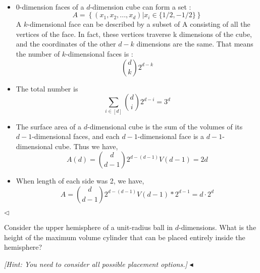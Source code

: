 \documentclass[11pt]{article}
\newenvironment{problem}[2][Problem]{\begin{trivlist}
\item[\hskip \labelsep {\bfseries #1}\hskip \labelsep {\bfseries #2.}]}{\hfill$\blacktriangleleft$\end{trivlist}}
\newenvironment{answer}[1][Answer]{\begin{trivlist}
\item[\hskip \labelsep {\bfseries #1.}\hskip \labelsep]}{\hfill$\lhd$\end{trivlist}}
\begin{document}
\begin{answer} ~
\begin{itemize}
    \item [(1)] 
0-dimension faces of a $d$-dimension cube can form a set :
$$A=\left\{(x_1,x_2,...,x_d)\big|x_i\in \{1/2,-1/2\}\right\}$$
A $k$-dimensional face can be described by a subset of A consisting of all the vertices of the face. In fact, these vertices traverse k dimensions of the cube, and the coordinates of the other $d-k$ dimensions are the same. That means the number of $k$-dimensional faces is :
$$\binom{d}{k}2^{d-k}$$
    \item [(2)] 
The total number is 
$$\sum_{i\in [d]}\binom{d}{i}2^{d-i}=3^d$$
    \item [(3)]
The surface area of ​​a $d$-dimensional cube is the sum of the volumes of its $d-1$-dimensional faces, and each $d-1$-dimensional face is a $d-1$-dimensional cube. Thus we have,
$$A(d)=\binom{d}{d-1}2^{d-(d-1)}V(d-1)=2d$$
    \item [(4)]
    When length of each side was 2, we have,
$$A=\binom{d}{d-1}2^{d-(d-1)}V(d-1)*2^{d-1}=d\cdot2^d$$
\end{itemize}
\end{answer}



\begin{problem}{7 (16')}
Consider the upper hemisphere of a unit-radius ball in $d$-dimensions. What is the height of the maximum volume cylinder that can be placed entirely inside the hemisphere?

\textit{[Hint: You need to consider all possible placement options.]}
\end{problem}
\end{document}

